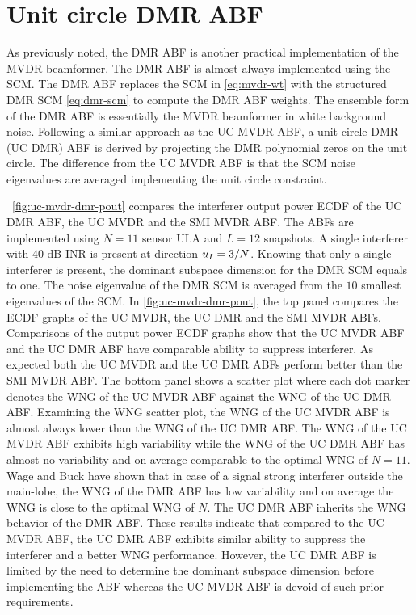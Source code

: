 \section{Unit circle DMR ABF}
\label{sec:uc-mvdr-dmr}
As previously noted, the DMR ABF is another practical implementation
of the MVDR beamformer. The DMR ABF is almost always implemented using
the SCM. The DMR ABF replaces the SCM in \eqref{eq:mvdr-wt} with the
structured DMR SCM \eqref{eq:dmr-scm} to compute the DMR ABF
weights. The ensemble form of the DMR ABF is essentially the MVDR
beamformer in white background noise. Following a
similar approach as the UC MVDR ABF, a unit circle DMR (UC DMR) ABF is
derived by projecting the DMR polynomial zeros on the unit circle. The
difference from the UC MVDR ABF is that the SCM noise eigenvalues are
averaged implementing the unit circle constraint.
  
\figurename{}~\ref{fig:uc-mvdr-dmr-pout} compares the interferer
output power ECDF of the UC DMR ABF, the UC MVDR and the SMI MVDR
ABF. The ABFs are implemented using $N = 11$ sensor ULA and $L = 12$
snapshots. A single interferer with $40$ dB INR is present at
direction $u_I = 3/N$. Knowing that only a single interferer is
present, the dominant subspace dimension for the DMR SCM equals to
one. The noise eigenvalue of the DMR SCM is averaged from the $10$
smallest eigenvalues of the SCM. In
\figurename{}\ref{fig:uc-mvdr-dmr-pout}, the top panel compares the
ECDF graphs of the UC MVDR, the UC DMR and the SMI MVDR
ABFs. Comparisons of the output power ECDF graphs show that the UC
MVDR ABF and the UC DMR ABF have comparable ability to suppress
interferer. As expected both the UC MVDR and the UC DMR ABFs perform
better than the SMI MVDR ABF. The bottom panel shows a scatter plot
where each dot marker denotes the WNG of the UC MVDR ABF against the
WNG of the UC DMR ABF. Examining the WNG scatter plot, the WNG of the
UC MVDR ABF is almost always lower than the WNG of the UC DMR ABF. The
WNG of the UC MVDR ABF exhibits high variability while the WNG of the
UC DMR ABF has almost no variability and on average comparable to the
optimal WNG of $N = 11$. Wage and Buck have shown that in case of a
signal strong interferer outside the main-lobe, the WNG of the DMR ABF
has low variability and on average the WNG is close to the optimal WNG
of $N$\cite{wage2013dmr}. The UC DMR ABF inherits the WNG behavior of
the DMR ABF. These results indicate that compared to the UC MVDR ABF,
the UC DMR ABF exhibits similar ability to suppress the interferer
and a better WNG performance. However, the UC DMR ABF is limited by
the need to determine the dominant subspace dimension before
implementing the ABF whereas the UC MVDR ABF is devoid of such prior
requirements.

